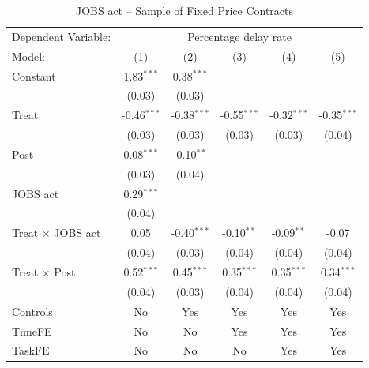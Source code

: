 \documentclass[
]{article}
\begin{document}
\begin{table}[htbp]
   \caption{JOBS act -- Sample of Fixed Price Contracts}
   \centering
   \footnotesize
   \begin{tabular}{lccccc}
      \tabularnewline \midrule \midrule
      Dependent Variable: & \multicolumn{5}{c}{Percentage delay rate}\\
      Model:                   & (1)           & (2)           & (3)           & (4)           & (5)\\  
      Constant                 & 1.83$^{***}$  & 0.38$^{***}$  &               &               &   \\   
                               & (0.03)        & (0.03)        &               &               &   \\   
      Treat                    & -0.46$^{***}$ & -0.38$^{***}$ & -0.55$^{***}$ & -0.32$^{***}$ & -0.35$^{***}$\\   
                               & (0.03)        & (0.03)        & (0.03)        & (0.03)        & (0.04)\\   
      Post                     & 0.08$^{***}$  & -0.10$^{**}$  &               &               &   \\   
                               & (0.03)        & (0.04)        &               &               &   \\   
      JOBS act                 & 0.29$^{***}$  &               &               &               &   \\   
                               & (0.04)        &               &               &               &   \\   
      Treat $\times$ JOBS act  & 0.05          & -0.40$^{***}$ & -0.10$^{**}$  & -0.09$^{**}$  & -0.07\\   
                               & (0.04)        & (0.03)        & (0.04)        & (0.04)        & (0.04)\\   
      Treat $\times$ Post      & 0.52$^{***}$  & 0.45$^{***}$  & 0.35$^{***}$  & 0.35$^{***}$  & 0.34$^{***}$\\   
                               & (0.04)        & (0.03)        & (0.04)        & (0.04)        & (0.04)\\   
      Controls                 & No            & Yes           & Yes           & Yes           & Yes\\  
      TimeFE                   & No            & No            & Yes           & Yes           & Yes\\  
      TaskFE                   & No            & No            & No            & Yes           & Yes\\  

\end{tabular}
\end{table}
\end{document}
